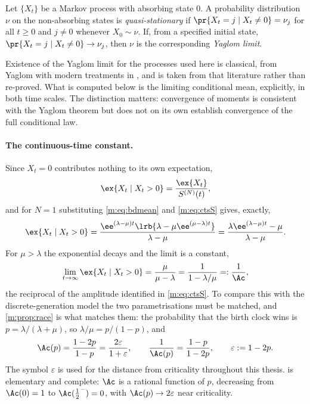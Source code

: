 \begin{definition}
\label{m:def:qsd}
Let $\{X_t\}$ be a Markov process with absorbing state $0$. A probability
distribution $\nu$ on the non-absorbing states is \emph{quasi-stationary} if
$\pr{X_t=j\mid X_t\neq0}=\nu_j$ for all $t\ge0$ and $j\neq0$ whenever
$X_0\sim\nu$. If, from a specified initial state,
$\pr{X_t=j\mid X_t\neq0}\to\nu_j$, then $\nu$ is the corresponding \emph{Yaglom
limit}.
\end{definition}

Existence of the Yaglom limit for the processes used here is classical, from Yaglom
\cite{Yaglom1947} with modern treatments in \cite{Harris1963,Athreya1972,Meleard2012},
and is taken from that literature rather than re-proved. What is computed below is
the limiting conditional mean, explicitly, in both time scales. The distinction
matters: convergence of moments is consistent with the Yaglom theorem but does not
on its own establish convergence of the full conditional law.

\paragraph{The continuous-time constant.}
Since $X_t=0$ contributes nothing to its own expectation,
\begin{equation}
\label{m:eq:condit}
\ex{X_t\mid X_t>0} = \frac{\ex{X_t}}{S^{(N)}(t)} ,
\end{equation}
and for $N=1$ substituting \cref{m:eq:bdmean} and \cref{m:eq:ctsS} gives, exactly,
\begin{equation}
\label{m:eq:ctscondmean}
\ex{X_t\mid X_t>0}
= \frac{\ee^{(\lambda-\mu)t}\lrb{\lambda-\mu\ee^{(\mu-\lambda)t}}}{\lambda-\mu}
= \frac{\lambda\ee^{(\lambda-\mu)t}-\mu}{\lambda-\mu} .
\end{equation}
For $\mu>\lambda$ the exponential decays and the limit is a constant,
\begin{equation}
\label{m:eq:ctsqsmean}
\lim_{t\to\infty}\ex{X_t\mid X_t>0} = \frac{\mu}{\mu-\lambda}
= \frac{1}{1-\lambda/\mu}
=: \frac{1}{\Ac} ,
\end{equation}
the reciprocal of the amplitude identified in \cref{m:eq:ctsS}. To compare this with
the discrete-generation model the two parametrisations must be matched, and
\cref{m:prop:race} is what matches them: the probability that the birth clock wins
is $p=\lambda/(\lambda+\mu)$, so $\lambda/\mu=p/(1-p)$, and
\begin{equation}
\label{m:eq:Acts}
\Ac(p) = \frac{1-2p}{1-p} = \frac{2\varepsilon}{1+\varepsilon},
\qquad
\frac{1}{\Ac(p)} = \frac{1-p}{1-2p},
\qquad
\varepsilon := 1-2p .
\end{equation}
The symbol $\varepsilon$ is used for the distance from criticality throughout this
thesis.  is elementary and complete: $\Ac$ is a rational function of
$p$, decreasing from $\Ac(0)=1$ to $\Ac(\tfrac12^-)=0$, with
$\Ac(p)\to2\varepsilon$ near criticality.

